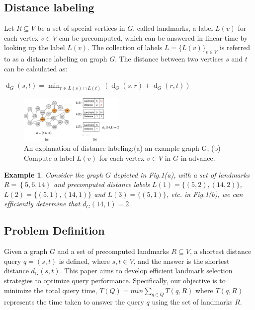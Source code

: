 \documentclass[sigconf]{acmart}
\newtheorem{example}{Example}
\begin{document}
\subsection{Distance labeling}
Let $R \subseteq V$ be a set of special vertices in $G$, called landmarks, a label $L(v)$ for each vertex $v \in V$ can be precomputed, which can be answered in linear-time by looking up the label $L(v)$. The collection of labels $L=\{L(v)\}_{v \in V}$ is referred to as a distance labeling on graph $G$. The distance between two vertices $s$ and $t$ can be calculated as:\par

\begin{center}
$\operatorname{d}_{G}(s, t)=\min _{r \in L(s) \cap L(t)} \left ( \operatorname{d}_{G}(s, r)+\operatorname{d}_G(r, t) \right )$
\end{center}
%
%
\begin{figure}
\centering
\includegraphics[width=0.45\textwidth]{figures/2-1-distance-labeling.png}
\caption{An explanation of distance labeling:(a) an example graph G, (b) Compute a label $L\left ( v \right ) $ for each vertex $v\in V$ in $G$ in advance.} \label{fig1}
\end{figure}

%
%
\begin{example}
    Consider the graph $G$ depicted in Fig.1(a), with a set of landmarks $R=\left \{ 5,6,14 \right \} $ and precomputed distance labels $L(1)=\{(5,2),(14,2)\}$, $L(2)=\{(5,1),(14,1)\}$ and $L(3)=\{(5,1)\}$, etc. in Fig.1(b), we can efficiently determine that $d_{G}(14,1)=2$.
\end{example}

\subsection{Problem Definition}
Given a graph $G$ and a set of precomputed landmarks $R \subseteq V$, a shortest distance query $q =(s, t)$ is defined, where $s, t \in V$, and the answer is the shortest distance $d_{G}(s, t)$. This paper aims to develop efficient landmark selection strategies to optimize query performance. Specifically, our objective is to minimize the total query time, $T(Q)=min {\textstyle \sum_{q\in Q}T(q,R)} $ where $T(q,R)$ represents the time taken to answer the query $q$ using the set of landmarks $R$.\par
\end{document}
